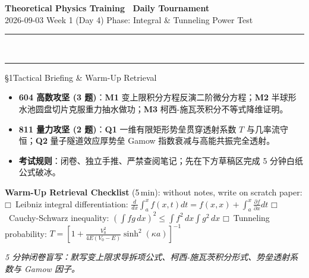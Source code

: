 \documentclass[a4paper,11pt]{article}
\newcommand{\checkbox}{\ensuremath{\mdlgwhtsquare}}
\begin{document}
\clearpage

\begin{center}
  {\LARGE\bfseries\color{navy} Theoretical Physics Training \textperiodcentered\ Daily Tournament}\\[3pt]
  {\small\sffamily\color{mist} 2026-09-03 \quad\textbar\quad Week 1 (Day 4) \quad\textbar\quad Phase: Integral \& Tunneling Power Test}\\[-4pt]
  {\color{navy}\rule{\textwidth}{0.8pt}}\\[-11pt]
  {\color{border}\rule{\textwidth}{0.3pt}}
\end{center}

\vspace{-6pt}

\begin{briefing}{\S 1\quad Tactical Briefing \& Warm-Up Retrieval}
\begin{itemize}[leftmargin=1.5em, itemsep=2pt, topsep=1pt]
  \item \textbf{604 高数攻坚 (3 题)}：\textbf{M1} 变上限积分方程反演二阶微分方程；\textbf{M2} 半球形水池圆盘切片克服重力抽水做功；\textbf{M3} 柯西-施瓦茨积分不等式降维证明。
  \item \textbf{811 量力攻坚 (2 题)}：\textbf{Q1} 一维有限矩形势垒贯穿透射系数 $T$ 与几率流守恒；\textbf{Q2} 量子隧道效应厚势垒 Gamow 指数衰减与高能共振完全透射。
  \item \textbf{考试规则}：闭卷、独立手推、严禁查阅笔记；先在下方草稿区完成 5 分钟白纸公式破冰。
\end{itemize}

\vspace{1mm}
\textbf{Warm-Up Retrieval Checklist} (5\,min): without notes, write on scratch paper:\\
\checkbox\ Leibniz integral differentiation: $\frac{d}{dx}\int_a^x f(x,t)dt = f(x,x) + \int_a^x \frac{\partial f}{\partial x}dt$ \quad
\checkbox\ Cauchy-Schwarz inequality: $(\int fg\,dx)^2 \le \int f^2\,dx \int g^2\,dx$ \quad
\checkbox\ Tunneling probability: $T = [1 + \frac{V_0^2}{4E(V_0-E)}\sinh^2(\kappa a)]^{-1}$
\end{briefing}

\vspace{4pt}

\begin{tcolorbox}[
  enhanced, colback=white, colframe=border, boxrule=0.6pt, arc=2mm,
  left=4mm, right=4mm, top=3mm, bottom=3mm,
  fonttitle=\sffamily\bfseries\color{slate},
  title={\raisebox{0pt}{\color{royal}\rule{3pt}{10pt}}\hspace{4pt}Warm-Up Retrieval Workspace \textbar\ 白纸破冰草稿区},
  colbacktitle=paper, coltitle=slate,
  titlerule=0pt, toptitle=2mm, bottomtitle=2mm
]
\textcolor{mist}{\footnotesize\itshape 5 分钟闭卷盲写：默写变上限求导拆项公式、柯西-施瓦茨积分形式、势垒透射系数与 Gamow 因子。}
\vspace{10.2cm}
\end{tcolorbox}
\end{document}
